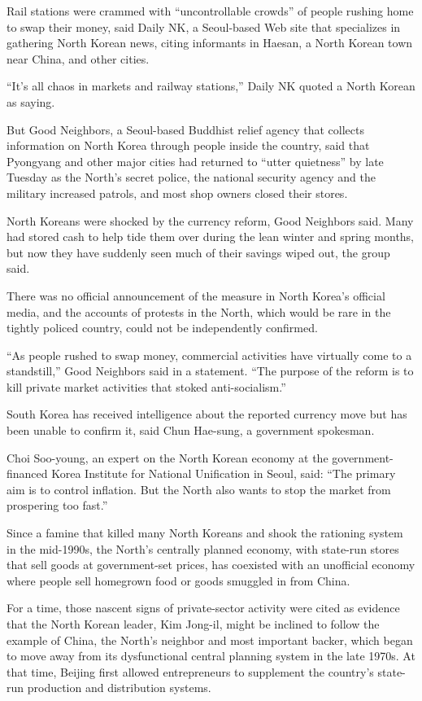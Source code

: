 ﻿\documentclass[12pt]{article}
\begin{document}
Rail stations were crammed with ``uncontrollable crowds'' of people rushing home to swap their
money, said Daily NK, a Seoul-based Web site that specializes in gathering North Korean news, citing
informants in Haesan, a North Korean town near China, and other cities.

``It's all chaos in markets and railway stations,'' Daily NK quoted a North Korean as saying.

But Good Neighbors, a Seoul-based Buddhist relief agency that collects information on North Korea
through people inside the country, said that Pyongyang and other major cities had returned to
``utter quietness'' by late Tuesday as the North's secret police, the national security agency and
the military increased patrols, and most shop owners closed their stores.

North Koreans were shocked by the currency reform, Good Neighbors said. Many had stored cash to help
tide them over during the lean winter and spring months, but now they have suddenly seen much of
their savings wiped out, the group said.

There was no official announcement of the measure in North Korea's official media, and the accounts
of protests in the North, which would be rare in the tightly policed country, could not be
independently confirmed.

``As people rushed to swap money, commercial activities have virtually come to a standstill,'' Good
Neighbors said in a statement. ``The purpose of the reform is to kill private market activities that
stoked anti-socialism.''

South Korea has received intelligence about the reported currency move but has been unable to
confirm it, said Chun Hae-sung, a government spokesman.

Choi Soo-young, an expert on the North Korean economy at the government-financed Korea Institute for
National Unification in Seoul, said: ``The primary aim is to control inflation. But the North also
wants to stop the market from prospering too fast.''

Since a famine that killed many North Koreans and shook the rationing system in the mid-1990s, the
North's centrally planned economy, with state-run stores that sell goods at government-set prices,
has coexisted with an unofficial economy where people sell homegrown food or goods smuggled in from
China.

For a time, those nascent signs of private-sector activity were cited as evidence that the North
Korean leader, Kim Jong-il, might be inclined to follow the example of China, the North's neighbor
and most important backer, which began to move away from its dysfunctional central planning system
in the late 1970s. At that time, Beijing first allowed entrepreneurs to supplement the country's
state-run production and distribution systems.
\end{document}
